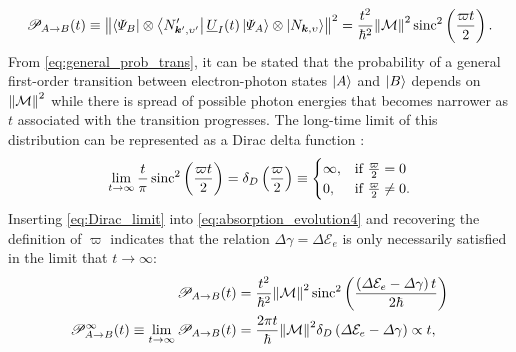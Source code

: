 \begin{equation}\label{eq:general_prob_trans}
 \mathscr{P}_{A \to B} (t) \equiv \norm{\bra{\Psi_B} \otimes \bra{N_{\mathbold{k}',\upsilon'}' } \underline{U}_I (t) \ket{\Psi_A} \otimes \ket{N_{\mathbold{k},\upsilon}}}^2 = \frac{t^2}{\hbar^2} \norm{\mathcal{M}}^2 \sinc^2 \left( \frac{\varpi t}{2} \right) .
 \end{equation}
From \cref{eq:general_prob_trans}, it can be stated that the probability of a general first-order transition between electron-photon states $\ket{A}$ and $\ket{B}$ depends on $\norm{\mathcal{M}}^2$ while there is spread of possible photon energies that becomes narrower as $t$ associated with the transition progresses. 
The long-time limit of this distribution can be represented as a Dirac delta function \cite{Townsend00}: %
\begin{equation}\label{eq:Dirac_limit}
 \lim_{t \to \infty} \frac{t}{\pi} \operatorname{sinc}^2 \left( \frac{\varpi t}{2} \right) = \delta_D \left( \frac{\varpi}{2} \right) \equiv
   \begin{cases}
     \infty, & \text{if}\ \frac{\varpi}{2} = 0 \\
     0, & \text{if}\ \frac{\varpi}{2} \neq 0 .
   \end{cases} 
 \end{equation}
Inserting \cref{eq:Dirac_limit} into \cref{eq:absorption_evolution4} and recovering the definition of $\varpi$ indicates that the relation $\Delta \gamma = \Delta \mathcal{E}_e$ is only necessarily satisfied in the limit that $t \to \infty$:%
\begin{align}\label{eq:general_evolution5}
 \begin{split}
 \mathscr{P}_{A \to B} (t) &= \frac{t^2}{\hbar^2} \norm{\mathcal{M}}^2 \operatorname{sinc}^2 \left( \frac{\left( \Delta \mathcal{E}_e - \Delta \gamma \right) t}{2 \hbar} \right) \\
 \mathscr{P}_{A \to B}^{\infty} (t) \equiv \lim_{t \to \infty} \mathscr{P}_{A \to B} (t) &= \frac{2 \pi t}{\hbar} \norm{\mathcal{M}}^2 \delta_D \left( \Delta \mathcal{E}_e - \Delta \gamma \right) \propto t ,
 \end{split}
 \end{align}
